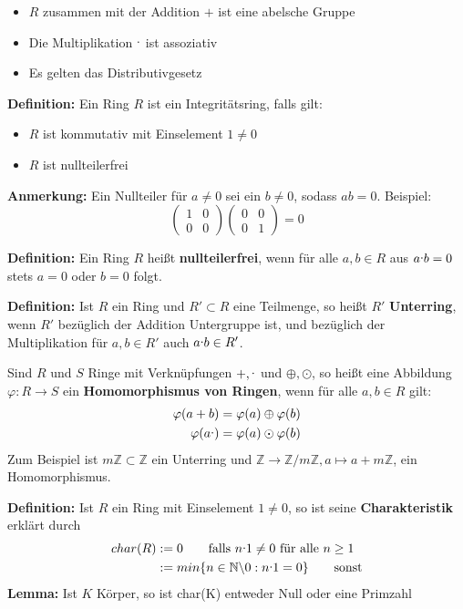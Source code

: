 \documentclass{article}
\let\oldcdot\cdot
\renewcommand{\cdot}{\raisebox{0.1ex}{$\oldcdot$}}
\begin{document}
\begin{itemize}
\item[\textbf{R1}] $R$ zusammen mit der Addition $+$ ist eine abelsche Gruppe
\item[\textbf{R2}] Die Multiplikation $\cdot$ ist assoziativ
\item[\textbf{R3}] Es gelten das Distributivgesetz
\end{itemize}

\textbf{Definition:} Ein Ring $R$ ist ein Integritätsring, falls gilt:
\begin{itemize}
\item[$i)$] $R$ ist kommutativ mit Einselement $1\neq0$
\item[$ii)$] $R$ ist nullteilerfrei
\end{itemize}

\textbf{Anmerkung:} Ein Nullteiler für $a\neq0$ sei ein $b\neq0$, sodass
$ab=0$. Beispiel:
\begin{equation*}
\begin{pmatrix}
	1 & 0\\
	0 & 0
\end{pmatrix}
\begin{pmatrix}
	0 & 0\\
	0 & 1
\end{pmatrix}=0
\end{equation*}

\textbf{Definition:} Ein Ring $R$ heißt \textbf{nullteilerfrei}, wenn für
alle $a,b\in R$ aus $a\cdot b=0$ stets $a=0$ oder $b=0$ folgt.

\textbf{Definition:} Ist $R$ ein Ring und $R'\subset R$ eine Teilmenge, so
heißt $R'$ \textbf{Unterring}, wenn $R'$ bezüglich der Addition Untergruppe
ist, und bezüglich der Multiplikation für $a,b\in R'$ auch $a\cdot b\in R'$.

Sind $R$ und $S$ Ringe mit Verknüpfungen $+,\cdot$ und $\oplus,\odot$, so heißt
eine Abbildung $\varphi: R\to S$ ein \textbf{Homomorphismus von Ringen}, wenn
für alle $a,b\in R$ gilt:
\begin{align*}
	\varphi(a+b) = \varphi(a)\oplus\varphi(b)\\
	\varphi(a\cdot) = \varphi(a)\odot\varphi(b)
\end{align*}
Zum Beispiel ist $m\mathbb{Z}\subset\mathbb{Z}$ ein Unterring und
$\mathbb{Z}\to\mathbb{Z}/m\mathbb{Z}, a\mapsto a+m\mathbb{Z}$, ein
Homomorphismus.

\textbf{Definition:} Ist $R$ ein Ring mit Einselement $1\neq 0$, so ist seine
\textbf{Charakteristik} erklärt durch
\begin{align*}
	char(R)&:= 0 \qquad \text{falls } n\cdot 1\neq 0 \text{ für alle } n\geq
	1\\
	&:=min\{n\in\mathbb{N}\backslash {0}:n\cdot 1 = 0\} \qquad \text{sonst}
\end{align*}
\textbf{Lemma:} Ist $K$ Körper, so ist char(K) entweder Null oder eine Primzahl
\end{document}
